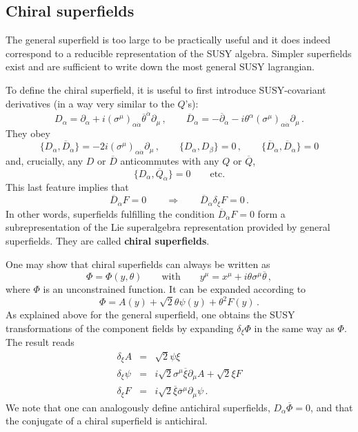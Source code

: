 \documentclass[12pt]{article}
\newcommand{\be}{\begin{equation}}
\newcommand{\ee}{\end{equation}}
\newcommand{\bea}{\begin{eqnarray}}
\newcommand{\eea}{\end{eqnarray}}
\newcommand{\ol}{\overline}
\numberwithin{equation}{section}
\begin{document}
\subsection{Chiral superfields}
The general superfield is too large to be practically useful and it does indeed correspond to a reducible representation of the SUSY algebra. Simpler superfields exist and are sufficient to write down the most general SUSY lagrangian. 

To define the chiral superfield, it is useful to first introduce SUSY-covariant derivatives (in a way very similar to the $Q$'s):
\be
D_\alpha=\partial_\alpha+i(\sigma^\mu)_{\alpha\dot{\alpha}} \ol{\theta}^{\dot{\alpha}}\partial_\mu\,,\qquad 
\ol{D}_{\dot{\alpha}}=-\ol{\partial}_{\dot{\alpha}}-i\theta^\alpha (\sigma^\mu)_{\alpha\dot{\alpha}} \partial_\mu\,.
\ee
They obey 
\be
\{D_\alpha,\ol{D}_{\dot{\alpha}}\}=-2i(\sigma^\mu)_{\alpha\dot{\alpha}} \partial_\mu\,, \qquad \{D_\alpha,D_\beta\}=0\,,\qquad \{\ol{D}_{\dot{\alpha}} ,\ol{D}_{\dot{\alpha}}\}=0
\ee
and, crucially, any $D$ or $\ol{D}$ anticommutes with any $Q$ or $\ol{Q}$,
\be
\{D_\alpha,\ol{Q}_{\dot{\alpha}}\}=0\qquad \mbox{etc.}
\ee
This last feature implies that
\be
\ol{D}_{\dot{\alpha}}F=0\qquad\Rightarrow\qquad \ol{D}_{\dot{\alpha}} \delta_\xi F=0\,.
\ee
In other words, superfields fulfilling the condition $\ol{D}_{\dot{\alpha}}F=0$ form a subrepresentation of the Lie superalgebra representation provided by general superfields. They are called {\bf chiral superfields}.

One may show that chiral superfields can always be written as 
\be
\Phi=\Phi(y,\theta)\qquad \mbox{with} \qquad y^\mu=x^\mu+i\theta\sigma^\mu\ol{\theta}\,,
\ee
where $\Phi$ is an unconstrained function. It can be expanded according to
\be
\Phi=A(y)+\sqrt{2}\theta\psi(y)+\theta^2 F(y)\,.\label{csfe}
\ee
As explained above for the general superfield, one obtains the SUSY transformations of the component fields by expanding $\delta_\xi\Phi$ in the same way as $\Phi$. The result reads
\bea
\delta_\xi A&=&\sqrt{2}\psi\xi
\nonumber \\
\delta_\xi\psi&=&i\sqrt{2}\sigma^\mu\ol{\xi}\partial_\mu A+\sqrt{2}\xi F
\\
\delta_\xi F&=&i\sqrt{2}\ol{\xi}\ol{\sigma}^\mu\partial_\mu \psi\,. \nonumber
\eea
We note that one can analogously define antichiral superfields, $D_\alpha\ol{\Phi}=0$, and that the conjugate of a chiral superfield is antichiral. 
\end{document}
